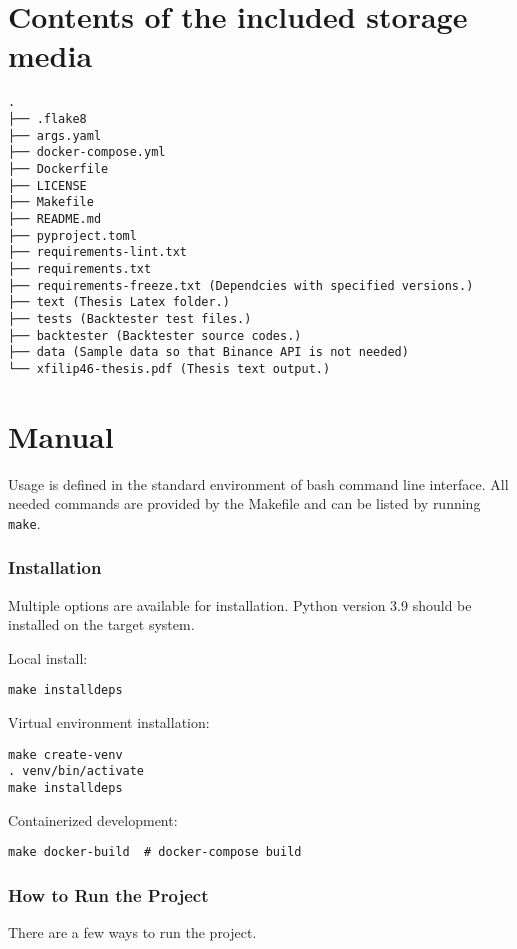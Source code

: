


\chapter{Contents of the included storage media}
\begin{verbatim}
.
├── .flake8
├── args.yaml
├── docker-compose.yml
├── Dockerfile
├── LICENSE
├── Makefile
├── README.md
├── pyproject.toml
├── requirements-lint.txt
├── requirements.txt
├── requirements-freeze.txt (Dependcies with specified versions.)
├── text (Thesis Latex folder.)
├── tests (Backtester test files.)
├── backtester (Backtester source codes.)
├── data (Sample data so that Binance API is not needed)
└── xfilip46-thesis.pdf (Thesis text output.)
\end{verbatim}


\chapter{Manual}
Usage is defined in the standard environment of bash command line interface. All needed commands are provided by the Makefile and can be listed by running \texttt{make}.

\subsection*{Installation}
Multiple options are available for installation. Python version 3.9 should be installed on the target system.

Local install:
\begin{verbatim}
make installdeps
\end{verbatim}

Virtual environment installation:
\begin{verbatim}
make create-venv
. venv/bin/activate
make installdeps
\end{verbatim}

Containerized development:
\begin{verbatim}
make docker-build  # docker-compose build
\end{verbatim}

\subsection*{How to Run the Project}
There are a few ways to run the project.

